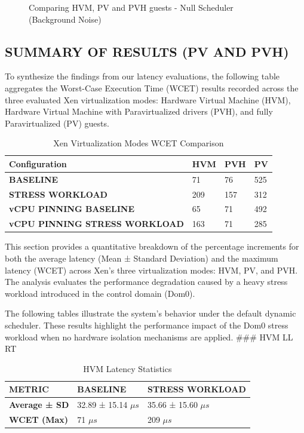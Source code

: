 \begin{figure}
\centering

\caption{Comparing HVM, PV and PVH guests - Null Scheduler (Background
Noise)}
\end{figure}

\subsection{SUMMARY OF RESULTS (PV AND
PVH)}\label{summary-of-results-pv-and-pvh}

To synthesize the findings from our latency evaluations, the following
table aggregates the Worst-Case Execution Time (WCET) results recorded
across the three evaluated Xen virtualization modes: Hardware Virtual
Machine (HVM), Hardware Virtual Machine with Paravirtualized drivers
(PVH), and fully Paravirtualized (PV) guests.

\begin{table}
\centering
\caption{Xen Virtualization Modes WCET Comparison}
\label{tab:xen:wcet-comparison}
\begin{tabularx}{\linewidth}{@{}YYYY@{}}
\toprule
Configuration & HVM & PVH & PV\tabularnewline
\midrule
\textbf{BASELINE} & 71 & 76 & 525\tabularnewline
\textbf{STRESS WORKLOAD} & 209 & 157 & 312\tabularnewline
\textbf{vCPU PINNING BASELINE} & 65 & 71 & 492\tabularnewline
\textbf{vCPU PINNING STRESS WORKLOAD} & 163 & 71 & 285\tabularnewline
\bottomrule
\end{tabularx}
\end{table}

This section provides a quantitative breakdown of the percentage
increments for both the average latency (Mean ± Standard Deviation) and
the maximum latency (WCET) across Xen's three virtualization modes: HVM,
PV, and PVH. The analysis evaluates the performance degradation caused
by a heavy stress workload introduced in the control domain (Dom0).

The following tables illustrate the system's behavior under the default
dynamic scheduler. These results highlight the performance impact of the
Dom0 stress workload when no hardware isolation mechanisms are applied.
\#\#\# HVM LL RT

\begin{table}
\centering
\caption{HVM Latency Statistics}
\begin{tabularx}{\linewidth}{@{}YYY@{}}
\toprule
METRIC & BASELINE & STRESS WORKLOAD\tabularnewline
\midrule
\textbf{Average ± SD} & 32.89 ± 15.14 $\mu s$ & 35.66 ± 15.60 $\mu s$\tabularnewline
\textbf{WCET (Max)} & 71 $\mu s$ & 209 $\mu s$\tabularnewline
\bottomrule
\end{tabularx}
\end{table}

